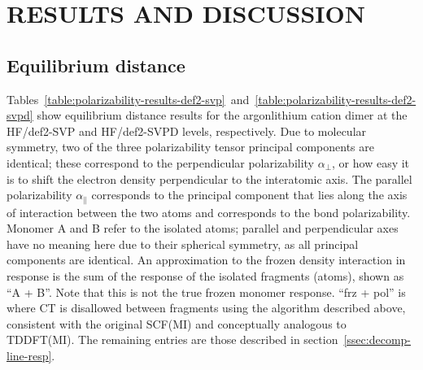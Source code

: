 \documentclass[%
  class = book,%
  crop = false,%
  float = true,%
  multi = true,%
  preview = false,%
]{standalone}
\let\cite\autocite
\newcommand{\caps}[1]{\uppercase{#1}}
\begin{document}
\section{\texorpdfstring{\caps{Results and Discussion}}{Results and Discussion}}
\label{sec:results-and-discussion}

\subsection{Equilibrium distance}
\label{ssec:results-equilibrium-distance}

\begin{table}
  \centering
  \caption[Argon\textemdash{}lithium cation dimer polarizabilities using HF/def2-SVP]{Polarizability results for the argon\textemdash{}lithium cation dimer at the HF/def2-SVP level. The geometry is optimized at the same level. All values have units of \aud{}.}
  \label{table:polarizability-results-def2-svp}
  \IfStandalone{}{}
\end{table}

\begin{table}
  \centering
  \caption[Argon\textemdash{}lithium cation dimer polarizabilities using HF/def2-SVPD]{Polarizability results for the argon\textemdash{}lithium cation dimer at the HF/def2-SVPD level. The geometry is optimized at the same level. All values have units of \aud{}.}
  \label{table:polarizability-results-def2-svpd}
  \IfStandalone{}{}
\end{table}

Tables~\ref{table:polarizability-results-def2-svp}~and~\ref{table:polarizability-results-def2-svpd} show equilibrium distance results for the argon\textemdash{}lithium cation dimer at the HF/def2-SVP and HF/def2-SVPD levels, respectively. Due to molecular symmetry, two of the three polarizability tensor principal components are identical; these correspond to the perpendicular polarizability \(\alpha_{\perp}\), or how easy it is to shift the electron density perpendicular to the interatomic axis. The parallel polarizability \(\alpha_{\parallel}\) corresponds to the principal component that lies along the axis of interaction between the two atoms and corresponds to the bond polarizability. Monomer A and B refer to the isolated atoms; parallel and perpendicular axes have no meaning here due to their spherical symmetry, as all principal components are identical. An approximation to the frozen density interaction in response is the sum of the response of the isolated fragments (atoms), shown as ``A + B''. Note that this is not the true frozen monomer response\cite{Mao_2017_5944}. ``frz + pol'' is where CT is disallowed between fragments using the algorithm described above, consistent with the original SCF(MI) and conceptually analogous to TDDFT(MI). The remaining entries are those described in section~\ref{ssec:decomp-line-resp}.
\end{document}
